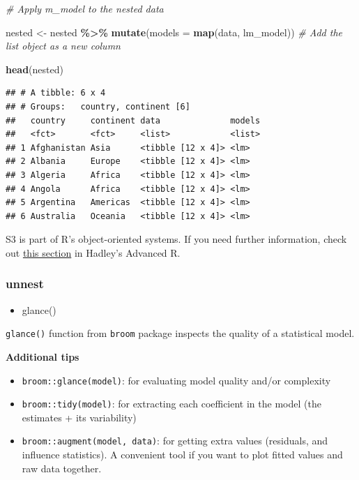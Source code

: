 \documentclass[
]{book}
\newenvironment{Shaded}{\begin{snugshade}}{\end{snugshade}}
\newcommand{\AttributeTok}[1]{\textcolor[rgb]{0.13,0.29,0.53}{#1}}
\newcommand{\CommentTok}[1]{\textcolor[rgb]{0.56,0.35,0.01}{\textit{#1}}}
\newcommand{\FunctionTok}[1]{\textcolor[rgb]{0.13,0.29,0.53}{\textbf{#1}}}
\newcommand{\NormalTok}[1]{#1}
\newcommand{\OtherTok}[1]{\textcolor[rgb]{0.56,0.35,0.01}{#1}}
\newcommand{\SpecialCharTok}[1]{\textcolor[rgb]{0.81,0.36,0.00}{\textbf{#1}}}
\providecommand{\tightlist}{%
  \setlength{\itemsep}{0pt}\setlength{\parskip}{0pt}}
\begin{document}
\begin{Shaded}
\begin{Highlighting}[]
\CommentTok{\# Apply m\_model to the nested data}

\NormalTok{nested }\OtherTok{\textless{}{-}}\NormalTok{ nested }\SpecialCharTok{\%\textgreater{}\%}
  \FunctionTok{mutate}\NormalTok{(}\AttributeTok{models =} \FunctionTok{map}\NormalTok{(data, lm\_model)) }\CommentTok{\# Add the list object as a new column}

\FunctionTok{head}\NormalTok{(nested)}
\end{Highlighting}
\end{Shaded}

\begin{verbatim}
## # A tibble: 6 x 4
## # Groups:   country, continent [6]
##   country     continent data              models
##   <fct>       <fct>     <list>            <list>
## 1 Afghanistan Asia      <tibble [12 x 4]> <lm>  
## 2 Albania     Europe    <tibble [12 x 4]> <lm>  
## 3 Algeria     Africa    <tibble [12 x 4]> <lm>  
## 4 Angola      Africa    <tibble [12 x 4]> <lm>  
## 5 Argentina   Americas  <tibble [12 x 4]> <lm>  
## 6 Australia   Oceania   <tibble [12 x 4]> <lm>
\end{verbatim}

S3 is part of R's object-oriented systems. If you need further information, check out \href{http://adv-r.had.co.nz/S3.html}{this section} in Hadley's Advanced R.

\subsubsection{unnest}\label{unnest}

\begin{itemize}
\tightlist
\item
  glance()
\end{itemize}

\texttt{glance()} function from \texttt{broom} package inspects the quality of a statistical model.

\textbf{Additional tips}

\begin{itemize}
\tightlist
\item
  \texttt{broom::glance(model)}: for evaluating model quality and/or complexity
\item
  \texttt{broom::tidy(model)}: for extracting each coefficient in the model (the estimates + its variability)
\item
  \texttt{broom::augment(model,\ data)}: for getting extra values (residuals, and influence statistics). A convenient tool if you want to plot fitted values and raw data together.
\end{itemize}
\end{document}
